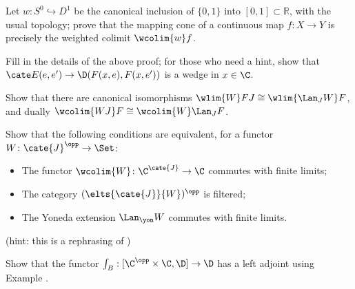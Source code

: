 \begin{exerciseset}
\begin{exercisepoints}
\item \label{ex:cone-again} Let $w\colon S^0 \hookrightarrow D^1$ be the canonical inclusion of $\{0,1\}$ into $[0,1]\subset \mathbb{R}$, with the usual topology; prove that the mapping cone of a continuous map $f\colon X\to Y$ is precisely the weighted colimit $\wcolim{w}f$.
\item Fill in the details of the above proof; for those who need a hint, show that $\cate E(e, e')\to \D(F(x,e), F(x, e'))$ is a wedge in $x\in \C$.
\item Show that there are canonical isomorphisms $\wlim{W}FJ\cong \wlim{\Lan_JW}F$, and dually $\wcolim{WJ}F\cong \wcolim{W}\Lan_JF$.
\item Show that the following conditions are equivalent, for a functor $W \colon \cate{J}^\opp\to \Set$:
\begin{itemize}
	\item The functor $\wcolim{W} \colon \C^\cate{J} \to \C$ commutes with finite limits;
	\item The category $(\elts{\cate{J}}{W})^\opp$ is filtered;
	\item The Yoneda extension $\Lan_\yon W$ commutes with finite limits.
\end{itemize}
(hint: this is a rephrasing of )
\item Show that the functor $\int_B : [\C^\opp\times\C,\D]\to \D$ has a left adjoint using Example .
\end{exercisepoints}
\end{exerciseset}
